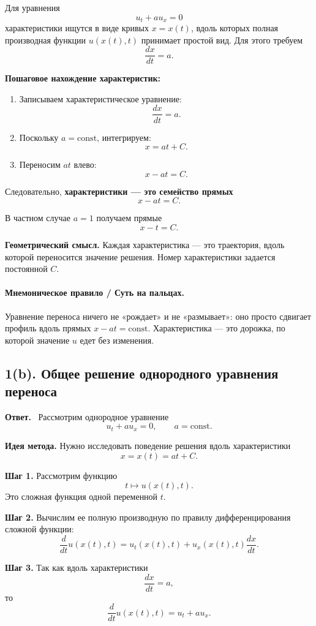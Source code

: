 \documentclass[a4paper,12pt]{article}
\newcommand{\Answer}{\textbf{Ответ.}\ }
\begin{document}
Для уравнения
\[
u_t+a u_x=0
\]
характеристики ищутся в виде кривых $x=x(t)$, вдоль которых полная производная функции $u(x(t),t)$ принимает простой вид. Для этого требуем
\[
\frac{dx}{dt}=a.
\]

\textbf{Пошаговое нахождение характеристик:}
\begin{enumerate}
  \item Записываем характеристическое уравнение:
  \[
  \frac{dx}{dt}=a.
  \]
  \item Поскольку $a=\mathrm{const}$, интегрируем:
  \[
  x=at+C.
  \]
  \item Переносим $at$ влево:
  \[
  x-at=C.
  \]
\end{enumerate}

Следовательно, \textbf{характеристики --- это семейство прямых}
\[
x-at=C.
\]

В частном случае $a=1$ получаем прямые
\[
x-t=C.
\]

\textbf{Геометрический смысл.} Каждая характеристика --- это траектория, вдоль которой переносится значение решения. Номер характеристики задается постоянной $C$.

\paragraph{Мнемоническое правило / Суть на пальцах.}
Уравнение переноса ничего не «рождает» и не «размывает»: оно просто сдвигает профиль вдоль прямых $x-at=\mathrm{const}$. Характеристика --- это дорожка, по которой значение $u$ едет без изменения.

\subsection*{1(b). Общее решение однородного уравнения переноса}

\Answer
Рассмотрим однородное уравнение
\[
u_t+a u_x=0,
\qquad a=\mathrm{const}.
\]

\textbf{Идея метода.} Нужно исследовать поведение решения вдоль характеристики
\[
x=x(t)=at+C.
\]

\textbf{Шаг 1.} Рассмотрим функцию
\[
t\longmapsto u(x(t),t).
\]
Это сложная функция одной переменной $t$.

\textbf{Шаг 2.} Вычислим ее полную производную по правилу дифференцирования сложной функции:
\[
\frac{d}{dt}u(x(t),t)=u_t(x(t),t)+u_x(x(t),t)\frac{dx}{dt}.
\]

\textbf{Шаг 3.} Так как вдоль характеристики
\[
\frac{dx}{dt}=a,
\]
то
\[
\frac{d}{dt}u(x(t),t)=u_t+a u_x.
\]
\end{document}
